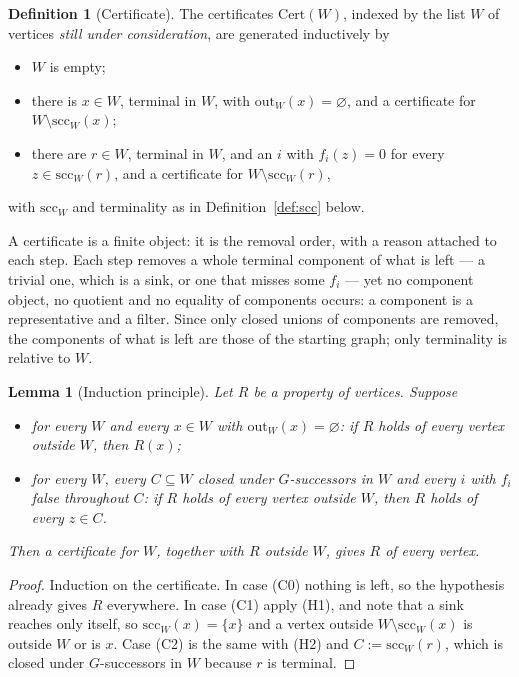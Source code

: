 \documentclass[11pt,a4paper]{article}
\newtheorem{lemma}[theorem]{Lemma}
\theoremstyle{definition}
\newtheorem{definition}[theorem]{Definition}
\newcommand{\outs}{\mathrm{out}}
\begin{document}
\begin{definition}[Certificate]\label{def:cert}
The certificates $\mathrm{Cert}(W)$, indexed by the list $W$ of vertices
\emph{still under consideration}, are generated inductively by
\begin{itemize}
\item[(C0)] $W$ is empty;
\item[(C1)] there is $x\in W$, terminal in $W$, with $\outs_W(x)=\varnothing$,
  and a certificate for $W\setminus\mathrm{scc}_W(x)$;
\item[(C2)] there are $r\in W$, terminal in $W$, and an $i$ with $f_i(z)=0$
  for every $z\in\mathrm{scc}_W(r)$, and a certificate for
  $W\setminus\mathrm{scc}_W(r)$,
\end{itemize}
with $\mathrm{scc}_W$ and terminality as in Definition~\ref{def:scc} below.
\end{definition}

A certificate is a finite object: it is the removal order, with a reason
attached to each step.  Each step removes a whole terminal component of what
is left --- a trivial one, which is a sink, or one that misses some $f_i$ ---
yet no component object, no quotient and no equality of components occurs: a
component is a representative and a filter.  Since only closed unions of
components are removed, the components of what is left are those of the
starting graph; only terminality is relative to $W$.

\begin{lemma}[Induction principle]\label{lem:certall}
Let $R$ be a property of vertices.  Suppose
\begin{itemize}
\item[(H1)] for every $W$ and every $x\in W$ with $\outs_W(x)=\varnothing$: if
  $R$ holds of every vertex outside $W$, then $R(x)$;
\item[(H2)] for every $W$, every $C\subseteq W$ closed under $G$-successors in
  $W$ and every $i$ with $f_i$ false throughout $C$: if $R$ holds of every
  vertex outside $W$, then $R$ holds of every $z\in C$.
\end{itemize}
Then a certificate for $W$, together with $R$ outside $W$, gives $R$ of every
vertex.
\end{lemma}

\begin{proof}
Induction on the certificate.  In case (C0) nothing is left, so the hypothesis
already gives $R$ everywhere.  In case (C1) apply (H1), and note that a sink
reaches only itself, so $\mathrm{scc}_W(x)=\{x\}$ and a vertex outside
$W\setminus\mathrm{scc}_W(x)$ is outside $W$ or is $x$.  Case (C2) is the same
with (H2) and $C:=\mathrm{scc}_W(r)$, which is closed under $G$-successors in
$W$ because $r$ is terminal.
\end{proof}
\end{document}
